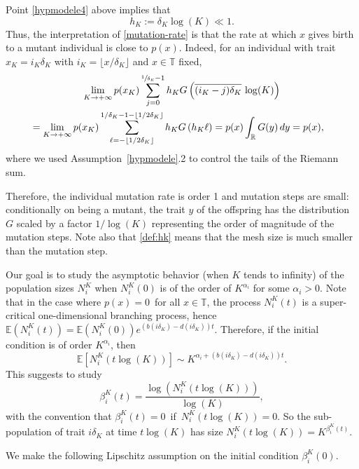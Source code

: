 \documentclass[JEP,XML,SOM,Unicode,published]{cedram}
\let\f\frac
\theoremstyle{plain}
\theoremstyle{remark}
\newcommand\T{\mathbb{T}}
\newcommand\E{\mathbb{E}}
\begin{document}
Point \eqref{hypmodele4} above implies that
\begin{equation}\label{def:hk}
h_K:=\delta_K \log(K)\ll 1.
\end{equation}
Thus, the interpretation of \eqref{mutation-rate} is that the rate at which $x$ gives birth to a mutant individual is close to $ p(x)$. Indeed, for an individual with trait $x_K=i_K \delta_K$ with $i_K=\lfloor x/\delta_K\rfloor$ and $x\in\T$ fixed,
\begin{multline*}%
\lim_{K\to +\infty}p(x_K)\sum_{j=0}^{\sfrac{1}{\delta_K}-1} h_K G\left(\overline{(i_K-j)\delta_K}\, \log(K)\right) \\
\begin{aligned} &= \lim_{K\to +\infty}p(x_K)\sum_{\ell=-\lfloor 1/2\delta_K\rfloor}^{1/\delta_K-1-\lfloor 1/2\delta_K\rfloor} h_K G\left(h_K\ell\right) =p(x)\int_{\mathbb{R}}G(y)\,dy=p(x),
\end{aligned}
\end{multline*}
where we used Assumption~\ref{hypmodele}.2 to control the tails of the Riemann sum.

Therefore, the individual mutation rate is order 1
and mutation steps are small: conditionally on being a mutant, the trait $y$ of the offspring has the distribution $G$ scaled by a factor $1/\log(K)$ representing the order of magnitude of the mutation steps.
Note also that \eqref{def:hk} means that the mesh size is much smaller than the mutation step.

Our goal is to study the asymptotic behavior (when $K$ tends to infinity) of the population sizes $N_i^K$ when $N_i^K(0)$ is of the order of $K^{\alpha_i}$ for some $\alpha_i>0$. Note that in the case where $p(x)=0\,$ for all $x\in\T$, the process $N^K_i(t)$ is a super-critical one-dimensional branching process, hence $\E(N^K_i(t))=\E(N^K_i(0)) e^{(b(i \delta_K)-d(i\delta_K))t}$. Therefore, if the initial condition is of order $K^{\alpha_i}$, then
\[
\E[ N^K_i(t\log(K))]\sim K^{\alpha_i + (b(i \delta_K)-d(i\delta_K))t}.
\]
This suggests to study
\begin{equation*}%
\label{beta}
\beta_i^K(t)=\f{\log(N_i^K(t \log(K)))}{\log(K)},
\end{equation*}
with the convention that $\beta^K_i(t)=0\,$ if $\,N^K_i(t\log(K))=0$. So the sub-population of trait $i\delta_K$ at time $t\log(K)$ has size $N^K_i(t \log(K))=K^{\beta^K_i(t)}$.

We make the following Lipschitz assumption on the initial condition $\beta^K_i(0)$.
\end{document}
